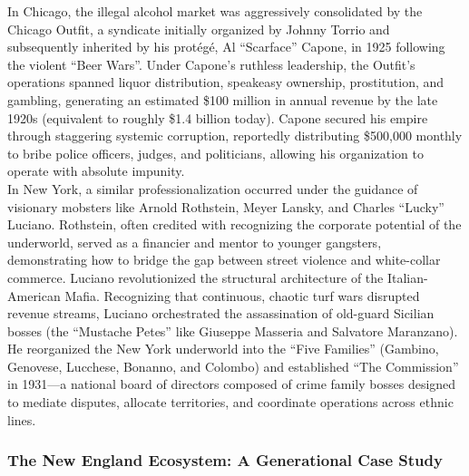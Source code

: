 \documentclass[
]{article}
\begin{document}
In Chicago, the illegal alcohol market was aggressively consolidated by
the Chicago Outfit, a syndicate initially organized by Johnny Torrio and
subsequently inherited by his protégé, Al ``Scarface'' Capone, in 1925
following the violent ``Beer Wars''. Under Capone's ruthless leadership,
the Outfit's operations spanned liquor distribution, speakeasy
ownership, prostitution, and gambling, generating an estimated \$100
million in annual revenue by the late 1920s (equivalent to roughly \$1.4
billion today). Capone secured his empire through staggering systemic
corruption, reportedly distributing \$500,000 monthly to bribe police
officers, judges, and politicians, allowing his organization to operate
with absolute impunity.\\
In New York, a similar professionalization occurred under the guidance
of visionary mobsters like Arnold Rothstein, Meyer Lansky, and Charles
``Lucky'' Luciano. Rothstein, often credited with recognizing the
corporate potential of the underworld, served as a financier and mentor
to younger gangsters, demonstrating how to bridge the gap between street
violence and white-collar commerce. Luciano revolutionized the
structural architecture of the Italian-American Mafia. Recognizing that
continuous, chaotic turf wars disrupted revenue streams, Luciano
orchestrated the assassination of old-guard Sicilian bosses (the
``Mustache Petes'' like Giuseppe Masseria and Salvatore Maranzano). He
reorganized the New York underworld into the ``Five Families'' (Gambino,
Genovese, Lucchese, Bonanno, and Colombo) and established ``The
Commission'' in 1931---a national board of directors composed of crime
family bosses designed to mediate disputes, allocate territories, and
coordinate operations across ethnic lines.

\subsubsection{\texorpdfstring{\textbf{The New England Ecosystem: A
Generational Case
Study}}{The New England Ecosystem: A Generational Case Study}}\label{the-new-england-ecosystem-a-generational-case-study}
\end{document}
